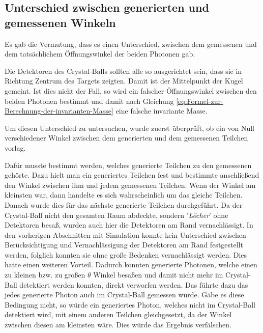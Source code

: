 \documentclass[a4paper,11pt,oneside,final,german,openbib,pdftex]{scrbook}
\begin{document}
{\subsection{Unterschied zwischen generierten und gemessenen Winkeln}
\label{sec:Unterschied-tatsaechlicher-gemessener-Winkel}

Es gab die Vermutung, dass es einen Unterschied, zwischen dem gemessenen und dem tatsächlichem Öffnungswinkel der beiden Photonen gab.

Die Detektoren des Crystal-Balls sollten alle so ausgerichtet sein, dass sie in Richtung Zentrum des Targets zeigten. Damit ist der Mittelpunkt der Kugel gemeint. Ist dies nicht der Fall, so wird ein falscher Öffnungswinkel zwischen den beiden Photonen bestimmt und damit nach Gleichung \ref{eq:Formel-zur-Berechnung-der-invarianten-Masse} eine falsche invariante Masse.

Um diesen Unterschied zu untersuchen, wurde zuerst überprüft, ob ein von Null verschiedener Winkel zwischen dem generierten und dem gemessenen Teilchen vorlag.

Dafür musste bestimmt werden, welches generierte Teilchen zu den gemessenen gehörte. Dazu hielt man ein generiertes Teilchen fest und bestimmte anschließend den Winkel zwischen ihm und jedem gemessenen Teilchen. Wenn der Winkel am kleinsten war, dann handelte es sich wahrscheinlich um das gleiche Teilchen. Danach wurde dies für das nächste generierte Teilchen durchgeführt. Da der Crystal-Ball nicht den gesamten Raum abdeckte, sondern '\textit{Löcher}' ohne Detektoren besaß, wurden auch hier die Detektoren am Rand vernachlässigt. In den vorherigen Abschnitten mit Simulation konnte kein Unterschied zwischen Berücksichtigung und Vernachlässigung der Detektoren am Rand festgestellt werden, folglich konnten sie ohne große Bedenken vernachlässigt werden. Dies hatte einen weiteren Vorteil. Dadurch konnten generierte Photonen, welche einen zu kleinen bzw. zu großen $\theta$ Winkel besaßen und damit nicht mehr im Crystal-Ball detektiert werden konnten, direkt verworfen werden. Das führte dazu das jedes generierte Photon auch im Crystal-Ball gemessen wurde. Gäbe es diese Bedingung nicht, so würde ein generiertes Photon, welches nicht im Crystal-Ball detektiert wird, mit einem anderen Teilchen gleichgesetzt, da der Winkel zwischen diesen am kleinsten wäre. Dies würde das Ergebnis verfälschen. 

}
\end{document}
